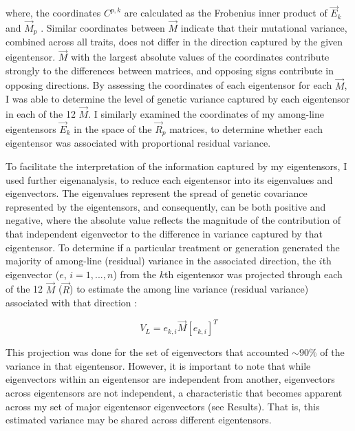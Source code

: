 \noindent where, the coordinates $C^{p,k}$ are calculated as the Frobenius inner product of $\vec{E}_k$ and $\vec{M}_p$ \citep{Hine09}. Similar coordinates between $\vec{M}$ indicate that their mutational variance, combined across all traits, does not differ in the direction captured by the given eigentensor. $\vec{M}$ with the largest absolute values of the coordinates contribute strongly to the differences between matrices, and opposing signs contribute in opposing directions. By assessing the coordinates of each eigentensor for each $\vec{M}$, I was able to determine the level of genetic variance captured by each eigentensor in each of the 12 $\vec{M}$. I similarly examined the coordinates of my among-line eigentensors $\vec{E}_k$ in the space of the $\vec{R}_p$ matrices, to determine whether each eigentensor was associated with proportional residual variance.\par

To facilitate the interpretation of the information captured by my eigentensors, I used further eigenanalysis, to reduce each eigentensor into its eigenvalues and eigenvectors. The eigenvalues represent the spread of genetic covariance represented by the eigentensors, and consequently, can be both positive and negative, where the absolute value reflects the magnitude of the contribution of that independent eigenvector to the difference in variance captured by that eigentensor. To determine if a particular treatment or generation generated the majority of among-line (residual) variance in the associated direction, the $i$th eigenvector ($e$, $i = 1,..., n$) from the $k$th eigentensor was projected through each of the 12 $\vec{M}$ ($\vec{R}$) to estimate the among line variance (residual variance) associated with that direction \citep{Hine09}: 

\vspace{-\parskip}
\begin{equation}
V_L= e_{k,i}\vec{M}[e_{k,i}]^{T} \label{eqn:multi_4_vlprj}
\end{equation}

\noindent This projection was done for the set of eigenvectors that accounted $\sim 90\%$ of the variance in that eigentensor. However, it is important to note that while eigenvectors within an eigentensor are independent from another, eigenvectors across eigentensors are not independent, a characteristic that becomes apparent across my set of major eigentensor eigenvectors (see Results). That is, this estimated variance may be shared across different eigentensors.\par

